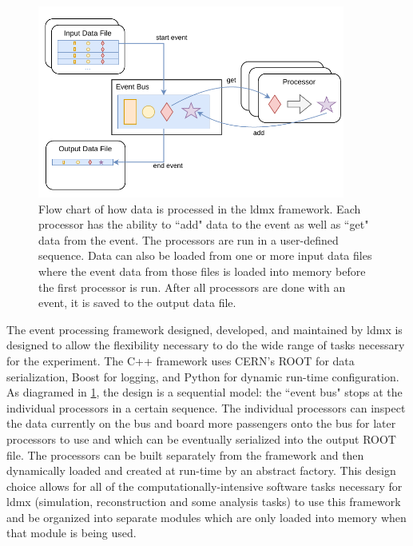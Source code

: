 \begin{figure}
  \centering
  \includegraphics[width=0.9\textwidth]{figures/ldmx/simulation/FrameworkFlowChart.drawio.pdf}
  \caption{Flow chart of how data is processed in the \ac{ldmx} framework. Each processor has the ability to ``add" data to the event as well as ``get" data from the event. The processors are run in a user-defined sequence. Data can also be loaded from one or more input data files where the event data from those files is loaded into memory before the first processor is run. After all processors are done with an event, it is saved to the output data file.}
  \label{fig:ldmx:sim:data-flow}
\end{figure}

The event processing framework designed, developed, and maintained by \ac{ldmx} is designed to
allow the flexibility necessary to do the wide range of tasks necessary for the experiment. The C++
framework uses CERN's ROOT \cite{cernroot} for data serialization, Boost for logging,
and Python \cite{python} for dynamic run-time configuration.
As diagramed in \cref{fig:ldmx:sim:data-flow}, the design is a sequential model: the
``event bus" stops at the individual processors in a certain sequence. The individual processors
can inspect the data currently on the bus and board more passengers onto the bus for later
processors to use and which can be eventually serialized into the output ROOT file. The processors can
be built separately from the framework and then dynamically loaded and created at run-time by an
abstract factory. This design choice allows for all of the computationally-intensive software tasks
necessary for \ac{ldmx} (simulation, reconstruction and some analysis tasks) to use this framework
and be organized into separate modules which are only loaded into memory when that module is being
used.

